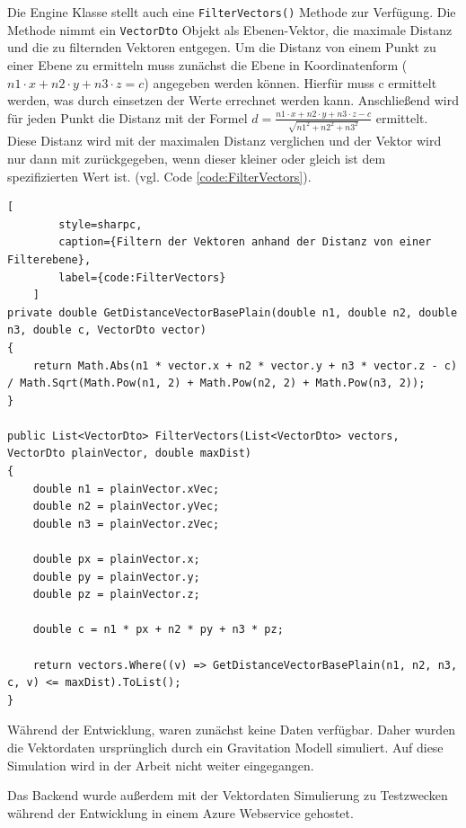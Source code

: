 Die Engine Klasse stellt auch eine \texttt{FilterVectors()} Methode zur Verfügung.
Die Methode nimmt ein \texttt{VectorDto} Objekt als Ebenen-Vektor, die maximale Distanz
und die zu filternden Vektoren entgegen. Um die Distanz von einem Punkt
zu einer Ebene zu ermitteln muss zunächst die Ebene in Koordinatenform
($n1 \cdot x + n2 \cdot y + n3 \cdot z = c$) angegeben werden können.
Hierfür muss c ermittelt werden, was durch einsetzen der Werte
errechnet werden kann. Anschließend wird für jeden Punkt die Distanz
mit der Formel $d = \frac{n1 \cdot x + n2 \cdot y + n3 \cdot z - c}{\sqrt{n1^2 + n2^2 + n3^2}}$ ermittelt.
Diese Distanz wird mit der maximalen Distanz verglichen und der Vektor
wird nur dann mit zurückgegeben, wenn dieser kleiner oder gleich ist dem spezifizierten Wert ist.
(vgl. Code \ref{code:FilterVectors}).

\begin{codeblock}
	\begin{lstlisting}[
		style=sharpc,
		caption={Filtern der Vektoren anhand der Distanz von einer Filterebene},
		label={code:FilterVectors}
	]
private double GetDistanceVectorBasePlain(double n1, double n2, double n3, double c, VectorDto vector)
{
	return Math.Abs(n1 * vector.x + n2 * vector.y + n3 * vector.z - c) / Math.Sqrt(Math.Pow(n1, 2) + Math.Pow(n2, 2) + Math.Pow(n3, 2));
}

public List<VectorDto> FilterVectors(List<VectorDto> vectors, VectorDto plainVector, double maxDist)
{
	double n1 = plainVector.xVec;
	double n2 = plainVector.yVec;
	double n3 = plainVector.zVec;

	double px = plainVector.x;
	double py = plainVector.y;
	double pz = plainVector.z;

	double c = n1 * px + n2 * py + n3 * pz;

	return vectors.Where((v) => GetDistanceVectorBasePlain(n1, n2, n3, c, v) <= maxDist).ToList();
}
	\end{lstlisting}
\end{codeblock}

Während der Entwicklung, waren zunächst keine Daten verfügbar.
Daher wurden die Vektordaten ursprünglich durch ein Gravitation Modell
simuliert. Auf diese Simulation wird in der Arbeit nicht weiter
eingegangen.

Das Backend wurde außerdem mit der Vektordaten Simulierung zu Testzwecken während
der Entwicklung in einem Azure Webservice gehostet.

